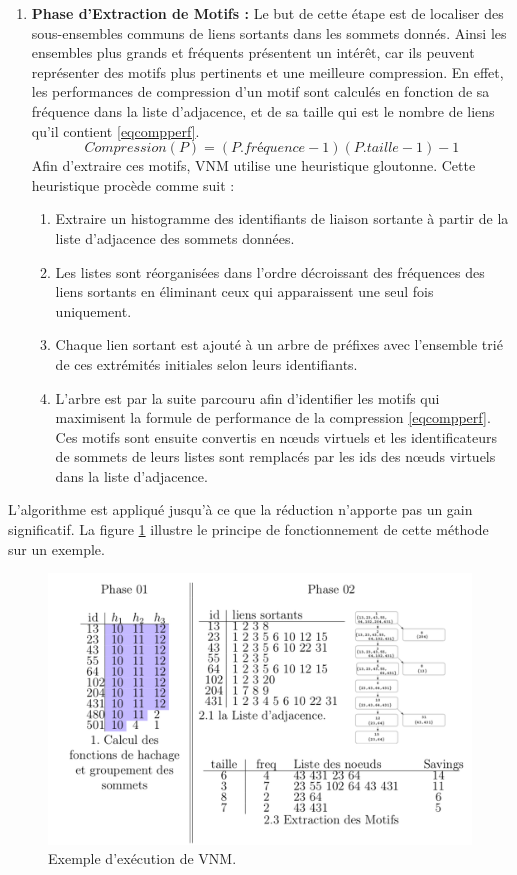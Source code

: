 \begin{enumerate}
					\item \textbf{Phase d'Extraction de Motifs :}				Le but de cette étape est de localiser des sous-ensembles communs de liens sortants dans les sommets donnés. 
				Ainsi les ensembles plus grands et fréquents présentent un intérêt, car ils peuvent représenter des motifs plus pertinents et une meilleure compression. En effet, les performances de compression d'un motif sont calculés en fonction de sa fréquence dans la liste d'adjacence, et de sa taille qui est le nombre de liens qu'il contient \eqref{eqcompperf}.
				\begin{equation}
				Compression(P)=(P.fréquence-1)(P.taille-1)-1
				\label{eqcompperf}
				\end{equation}
				Afin d'extraire ces motifs, VNM utilise une heuristique gloutonne. Cette heuristique procède comme suit :
				\begin{enumerate}
				\item Extraire un histogramme des identifiants de liaison sortante à partir de la liste d'adjacence des sommets données.
				\item Les listes sont réorganisées dans l'ordre décroissant des fréquences des liens sortants en éliminant ceux qui apparaissent une seul fois uniquement.
				\item Chaque lien sortant est ajouté à un arbre de préfixes avec l'ensemble trié de ces extrémités initiales selon leurs identifiants. 
				\item L'arbre est par la suite parcouru afin d'identifier les motifs qui maximisent la formule de performance de la compression \ref{eqcompperf}. Ces motifs sont ensuite convertis en nœuds virtuels et les identificateurs de sommets de leurs listes sont remplacés par les ids des nœuds virtuels dans la liste d'adjacence.
				\end{enumerate}
				 
				\end{enumerate}
				
				L'algorithme est appliqué jusqu'à ce que la réduction n'apporte pas un gain significatif. La figure \ref{VNM_exemple} illustre le principe de fonctionnement de cette méthode sur un exemple.
				
				
		
		
			\begin{figure}[!h]
			\includegraphics[scale=0.3,center]{./ressources/image/VNM_exemple.png}
			\caption[Exemple d'exécution de VNM.]{Exemple d'exécution de VNM.}
			\label{VNM_exemple}
	\end{figure}